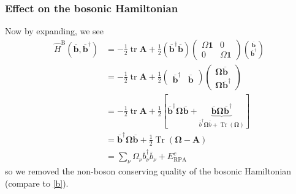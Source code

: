 \subsubsection{Effect on the bosonic Hamiltonian}
Now by expanding, we see
\begin{align}
\hat{H}^{\mathrm{B}}\left(\overline{\mathbf{b}},
\overline{\mathbf{b}}^{\dagger}\right)&=-\frac{1}{2} \operatorname{tr} \mathbf{A}+\frac{1}{2}\left(\overline{\mathbf{b}}^{\dagger} \overline{\mathbf{b}}\right)\left(\begin{array}{cc}\Omega \mathbf{1} & 0 \\
0 & \Omega \mathbf{1}
\end{array}\right)\binom{\overline{\mathbf{b}}}{\overline{\mathbf{b}}^{\dagger}} \\
&=-\frac{1}{2} \operatorname{tr} \mathbf{A}+ \frac{1}{2}\begin{pmatrix}
\overline{\mathbf{b}}^{\dagger} & \overline{\mathbf{b}}\end{pmatrix}
\begin{pmatrix}
\bm{\Omega} \overline{\mathbf{b}} \\
\bm{\Omega} \overline{\mathbf{b}}^{\dagger}
\end{pmatrix}
\\
&=-\frac{1}{2} \operatorname{tr} \mathbf{A}+\frac{1}{2}\left[\overline{\mathbf{b}}^{\dagger} \bm{\Omega} \overline{\mathbf{b}} + \underbrace{\overline{\mathbf{b}} \bm{\Omega} \overline{\mathbf{b}}^{\dagger}}_{\overline{b}^\dagger \bm{\Omega} \overline{b} + \operatorname{Tr}\left(\bm{\Omega}\right)}\right] \\
&=\overline{\mathbf{b}}^{\dagger} \bm{\Omega} \overline{\mathbf{b}} + \frac{1}{2}\operatorname{Tr}\left(\bm{\Omega} - \mathbf{A}\right) \\
&=\sum_{\nu} \Omega_\nu \overline{b}_\nu^{\dagger} \overline{b}_\nu + E_{\mathrm{RPA}}^c
\end{align}
so we removed the non-boson conserving quality of the bosonic Hamiltonian (compare to \ref{b}).
